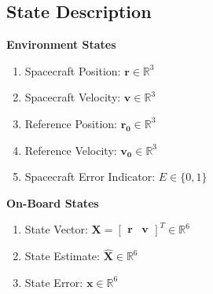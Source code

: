 \documentclass[]{article}
\begin{document}
\begin{multicols}{2}
\subsection{State Description}
\textbf{Environment States}

\begin{enumerate}
	\item Spacecraft Position: $\mathbf{r} \in \mathbb{R}^3$
	\item Spacecraft Velocity: $\mathbf{v} \in \mathbb{R}^3$
	\item Reference Position: $\mathbf{r_0} \in \mathbb{R}^3$
	\item Reference Velocity: $\mathbf{v_0} \in \mathbb{R}^3$
	\item Spacecraft Error Indicator: $E \in \{0,1\}$
\end{enumerate}

\textbf{On-Board States}
\begin{enumerate}
	\item State Vector: $\mathbf{X}= \begin{bmatrix} \mathbf{r} &\mathbf{v}\end{bmatrix}^T \in \mathbb{R}^6$
	\item State Estimate: $\mathbf{\hat{X}} \in \mathbb{R}^6$
	\item State Error: $\mathbf{x} \in \mathbb{R}^6$
\end{enumerate}
\end{multicols}
\end{document}
